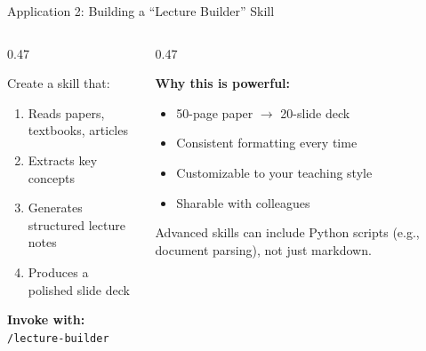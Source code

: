 \documentclass[aspectratio=169, 10pt]{beamer}
\begin{document}
{
\begin{frame}
\end{frame}
}

\begin{frame}{Application 2: Building a ``Lecture Builder'' Skill}
\begin{columns}[T]
\begin{column}{0.47\textwidth}
\begin{tcolorbox}[keybox, title={\faCubes\quad The Goal}]
\scriptsize
Create a skill that:
\begin{enumerate}\setlength{\itemsep}{1pt}
  \item Reads papers, textbooks, articles
  \item Extracts key concepts
  \item Generates structured lecture notes
  \item Produces a polished slide deck
\end{enumerate}
\vskip2pt
\textbf{Invoke with:} \texttt{/lecture-builder}
\end{tcolorbox}
\end{column}
\begin{column}{0.47\textwidth}
\begin{tcolorbox}[accentbox]
\scriptsize
\textbf{Why this is powerful:}
\begin{itemize}\setlength{\itemsep}{0pt}\tiny
  \item 50-page paper $\rightarrow$ 20-slide deck
  \item Consistent formatting every time
  \item Customizable to your teaching style
  \item Sharable with colleagues
\end{itemize}
\end{tcolorbox}
\vskip3pt
{\tiny\color{CoolGray} Advanced skills can include Python scripts (e.g., document parsing), not just markdown.}
\end{column}
\end{columns}
\end{frame}
\end{document}
